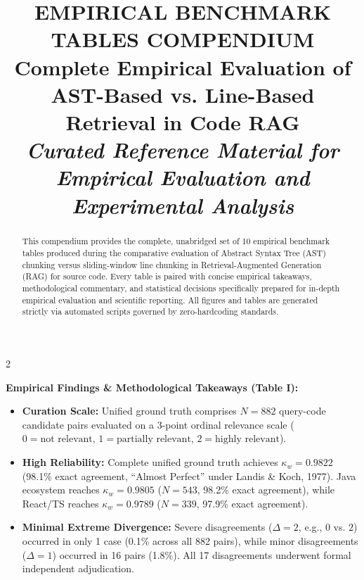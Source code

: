 \documentclass[11pt,a4paper,landscape]{article}
\title{\textbf{\LARGE EMPIRICAL BENCHMARK TABLES COMPENDIUM}\\[0.2cm]
\large Complete Empirical Evaluation of AST-Based vs. Line-Based Retrieval in Code RAG\\[0.2cm]
\normalsize\textit{Curated Reference Material for Empirical Evaluation and Experimental Analysis}}
\author{}
\date{}
\begin{document}
\maketitle
\thispagestyle{empty}

\begin{abstract}
This compendium provides the complete, unabridged set of 10 empirical benchmark tables produced during the comparative evaluation of Abstract Syntax Tree (AST) chunking versus sliding-window line chunking in Retrieval-Augmented Generation (RAG) for source code. Every table is paired with concise empirical takeaways, methodological commentary, and statistical decisions specifically prepared for in-depth empirical evaluation and scientific reporting. All figures and tables are generated strictly via automated scripts governed by zero-hardcoding standards.
\end{abstract}

\vspace{0.3cm}
{\setlength{\columnsep}{1.5cm}
\begin{multicols}{2}
\tableofcontents
\end{multicols}
}
\clearpage

\clearpage
{}

\FloatBarrier
\vspace{-0.1cm}
{\small
\noindent\textbf{Empirical Findings \& Methodological Takeaways (Table I):}
\begin{itemize}[nosep,topsep=2pt,partopsep=0pt,itemsep=2pt]
    \item \textbf{Curation Scale:} Unified ground truth comprises $N=882$ query-code candidate pairs evaluated on a 3-point ordinal relevance scale ($0 = \text{not relevant}$, $1 = \text{partially relevant}$, $2 = \text{highly relevant}$).
    \item \textbf{High Reliability:} Complete unified ground truth achieves $\kappa_w = 0.9822$ (98.1\% exact agreement, ``Almost Perfect'' under Landis \& Koch, 1977). Java ecosystem reaches $\kappa_w = 0.9805$ ($N=543$, 98.2\% exact agreement), while React/TS reaches $\kappa_w = 0.9789$ ($N=339$, 97.9\% exact agreement).
    \item \textbf{Minimal Extreme Divergence:} Severe disagreements ($\Delta = 2$, e.g., $0$ vs. $2$) occurred in only 1 case (0.1\% across all 882 pairs), while minor disagreements ($\Delta = 1$) occurred in 16 pairs (1.8\%). All 17 disagreements underwent formal independent adjudication.
\end{itemize}
}
\clearpage
\end{document}
